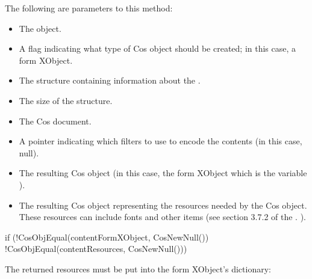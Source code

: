 \documentclass[letterpaper,12pt,english,openany,oneside]{sphinxmanual}
\begin{document}
The following are parameters to this method:
\begin{itemize}
\item {} 
The  object.

\item {} 
A flag indicating what type of Cos object should be created; in this case, a form XObject.

\item {} 
The  structure containing information about the .

\item {} 
The size of the  structure.

\item {} 
The Cos document.

\item {} 
A pointer indicating which filters to use to encode the contents (in this case, null).

\item {} 
The resulting Cos object (in this case, the form XObject which is the variable  ).

\item {} 
The resulting Cos object representing the resources needed by the Cos object. These resources can include fonts and other items (see section 3.7.2 of the . ).

\end{itemize}

\begin{sphinxVerbatim}[commandchars=\\\{\}]
if (!CosObjEqual(contentFormXObject, CosNewNull()) \PYGZam{}\PYGZam{}
    !CosObjEqual(contentResources, CosNewNull())) \PYGZob{}
\end{sphinxVerbatim}

The returned resources must be put into the form XObject’s  dictionary:

\begin{sphinxVerbatim}[commandchars=\\\{\}]
 
\end{sphinxVerbatim}
\end{document}
